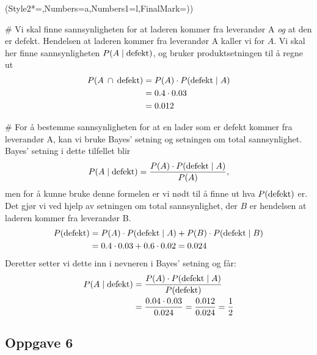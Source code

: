 \begin{easylist}[enumerate]
	\ListProperties(Style2*=,Numbers=a,Numbers1=l,FinalMark={)})
	
	
	#  Vi skal finne sannsynligheten for at laderen kommer fra leverandør A \emph{og} at den er defekt. 
	Hendelsen at laderen kommer fra leverandør A kaller vi for $A$.
	Vi skal her finne sannsynligheten $P(A \mid \textnormal{defekt})$, og bruker produktsetningen til å regne ut
	\begin{align*}
			P(A \: \cap \: \textnormal{defekt}) & = P(A) \cdot P(\textnormal{defekt}  \mid A) \\
			& = 0.4 \cdot 0.03 \\
			& = 0.012
	\end{align*}
	
	# For å bestemme sannsynligheten for at en lader som er defekt kommer fra leverandør A, kan vi bruke Bayes' setning og setningen om total sannsynlighet. 
	Bayes' setning i dette tilfellet blir 
	\begin{equation*}
			P(A \mid  \textnormal{defekt}) = \frac{P(A) \cdot P(\textnormal{defekt} \mid A)}{P(A)},
	\end{equation*}
	men for å kunne bruke denne formelen er vi nødt til å finne ut hva $P(\textnormal{defekt})$ er. 
	Det gjør vi ved hjelp av setningen om total sannsynlighet, der $B$ er hendelsen at laderen kommer fra leverandør B.
	\begin{align*}
	P(\textnormal{defekt}) & = P(A) \cdot P(\textnormal{defekt} \mid A) + P(B) \cdot P(\textnormal{defekt} \mid B) \\
	& = 0.4 \cdot 0.03 + 0.6 \cdot 0.02 = 0.024
	\end{align*}
	Deretter setter vi dette inn i nevneren i Bayes' setning og får:
	\begin{align*}
			P(A \mid  \textnormal{defekt}) &= \frac{P(A) \cdot P(\textnormal{defekt} \mid A)}{P(\textnormal{defekt})} \\
			& = \frac{0.04 \cdot 0.03}{0.024} = \frac{0.012}{0.024} = \frac{1}{2}
	\end{align*}	
\end{easylist}


	
\subsection*{Oppgave 6}


